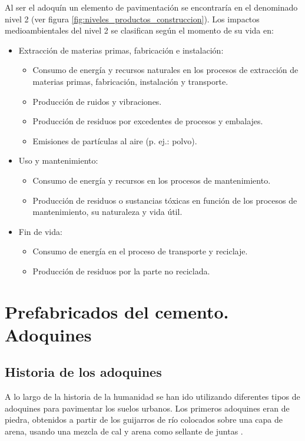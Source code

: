 Al ser el adoquín un elemento de pavimentación se encontraría en el denominado nivel 2 (ver figura \ref{fig:niveles_productos_construccion}). Los impactos medioambientales del nivel 2 se clasifican según el momento de su vida en:

\begin{itemize}
  \item Extracción de materias primas, fabricación e instalación:
    \begin{itemize}
     \item Consumo de energía y recursos naturales en los procesos de extracción de materias primas, fabricación, instalación y transporte.
     \item Producción de ruidos y vibraciones.
     \item Producción de residuos por excedentes de procesos y embalajes.
     \item Emisiones de partículas al aire (p. ej.: polvo).
    \end{itemize}
  \item Uso y mantenimiento:
    \begin{itemize}
      \item Consumo de energía y recursos en los procesos de mantenimiento.
      \item Producción de residuos o sustancias tóxicas en función de los procesos de mantenimiento, su naturaleza y vida útil.
    \end{itemize}
  \item Fin de vida:
    \begin{itemize}
      \item Consumo de energía en el proceso de transporte y reciclaje.
      \item Producción de residuos por la parte no reciclada.
    \end{itemize}
\end{itemize}

\section{Prefabricados del cemento. Adoquines}

\subsection{Historia de los adoquines}
A lo largo de la historia de la humanidad se han ido utilizando diferentes tipos de adoquines para pavimentar los suelos urbanos. Los primeros adoquines eran de piedra, obtenidos a partir de los guijarros de río colocados sobre una capa de arena, usando una mezcla de cal y arena como sellante de juntas  \cite{euroadoquin}.

